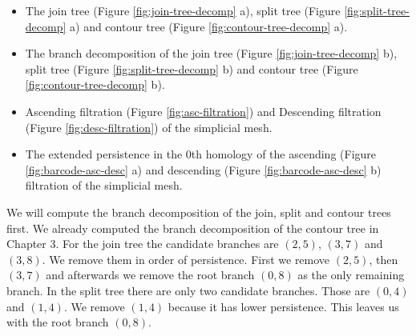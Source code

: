 \begin{itemize}

    \item The join tree (Figure \ref{fig:join-tree-decomp} a), split tree (Figure \ref{fig:split-tree-decomp} a) and contour tree (Figure \ref{fig:contour-tree-decomp} a).

    \item The branch decomposition of the join tree (Figure \ref{fig:join-tree-decomp} b), split tree (Figure \ref{fig:split-tree-decomp} b) and contour tree (Figure \ref{fig:contour-tree-decomp} b).

    \item Ascending filtration (Figure \ref{fig:asc-filtration}) and Descending filtration (Figure \ref{fig:desc-filtration}) of the simplicial mesh.


    \item The extended persistence in the 0th homology of the ascending (Figure \ref{fig:barcode-asc-desc} a) and descending (Figure \ref{fig:barcode-asc-desc} b) filtration of the simplicial mesh.


\end{itemize}

We will compute the branch decomposition of the join, split and contour trees first. We already computed the branch decomposition of the contour tree in Chapter 3. For the join tree the candidate branches are $(2, 5)$, $(3, 7)$ and $(3, 8)$. We remove them in order of persistence. First we remove $(2, 5)$, then $(3, 7)$ and afterwards we remove the root branch $(0, 8)$ as the only remaining branch. In the split tree there are only two candidate branches. Those are $(0, 4)$ and $(1, 4)$. We remove $(1, 4)$ because it has lower persistence. This leaves us with the root branch $(0, 8)$.

